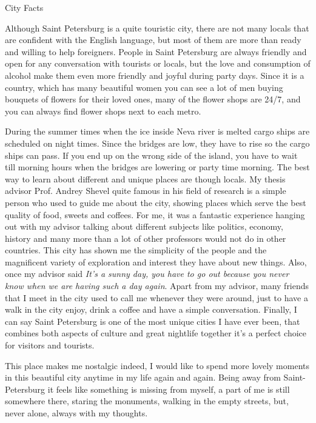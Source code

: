 \documentclass[10pt,a4paper]{article} %
\newcommand{\NewsItem}[1]{ %
\usefont{T1}{fvs}{n}{n} %
\vspace{24pt}\large #1\vspace{3pt} %
\par \normalsize \normalfont}
\begin{document}
\begin{multicols}{3}
\NewsItem{City Facts}
Although Saint Petersburg is a quite touristic city, 
there are not many locals that are confident with the English language,
but most of them are more than ready and willing to help foreigners. 
People in Saint Petersburg are always friendly and open for any conversation 
with tourists or locals, but the love and consumption of alcohol make them even 
more friendly and joyful during party days. 
Since it is a country, which has many beautiful women you can see a lot of men 
buying bouquets of flowers for their loved ones, 
many of the flower shops are 24/7, and you can always find flower shops next to each metro.

During the summer times when the ice inside Neva river is melted cargo ships are 
scheduled on night times. 
Since the bridges are low, they have to rise so the cargo ships can pass. 
If you end up on the wrong side of the island, 
you have to wait till morning hours when the bridges are lowering or party time morning.
The best way to learn about different and unique places are though locals. 
My thesis advisor Prof. Andrey Shevel quite famous in his field of research 
is a simple person who used to guide me about the city, 
showing places which serve the best quality of food, sweets and coffees. 
For me, it was a fantastic experience hanging out with 
my advisor talking about different subjects like politics, economy, 
history and many more than a lot of other professors would not do in other countries. 
This city has shown me the simplicity of the people and the magnificent variety of exploration 
and interest they have about new things. 
Also, once my advisor said \textit{It's a sunny day, 
	you have to go out because you never know when we are having such a day again}. 
Apart from my advisor, many friends that I meet in the city used to call 
me whenever they were around, just to have a walk in the city enjoy, 
drink a coffee and have a simple conversation. 
Finally, I can say Saint Petersburg is one of the most unique cities I have ever been, 
that combines both aspects of culture and great nightlife together
it's a perfect choice for visitors and tourists.

This place makes me nostalgic indeed, 
I would like to spend more lovely moments in this beautiful city anytime in my life again and again. Being away from Saint-Petersburg it feels like something is missing from myself, a part of me is still somewhere there, staring the monuments, walking in the empty streets, but, never alone, always with my thoughts.





\end{multicols}
\end{document}
